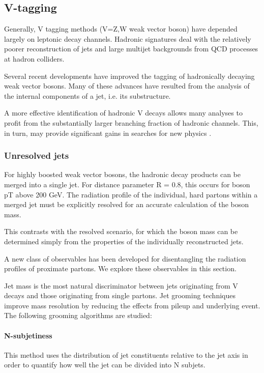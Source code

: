 \subsection{V-tagging}

Generally, V tagging methods (V=Z,W weak vector boson) have depended largely on leptonic decay channels. Hadronic signatures
deal with the relatively poorer reconstruction of jets and large multijet backgrounds from QCD processes at hadron colliders.

Several recent developments have improved the tagging of hadronically decaying weak vector bosons. Many of these advances have resulted from the analysis of the internal components
of a jet, i.e. its substructure.

A more effective identification of hadronic V decays allows many analyses to profit from the substantially larger branching fraction of hadronic channels. This,
in turn, may provide significant gains in searches for new physics \cite{vtagging}.

\subsubsection{Unresolved jets}

For highly boosted weak vector bosons, the hadronic decay products can be merged into a single jet. For distance parameter R = 0.8, this occurs for boson pT above 200 GeV. The radiation profile of the individual, hard partons within a merged jet must be explicitly resolved for an accurate calculation of the boson mass. 

This contrasts with the resolved scenario, for which the boson mass can be determined simply from the properties of the individually reconstructed jets.

A new class of observables has been developed for disentangling the radiation profiles of proximate partons. We explore these observables in this section.

Jet mass is the most natural discriminator between jets originating from V decays and those originating from single partons. Jet grooming techniques improve mass resolution by reducing the effects from pileup and underlying event. The following grooming algorithms are studied:

\paragraph{N-subjetiness}\label{tau21sec}
This method uses the distribution of jet constituents relative to the jet axis in order to quantify how well the jet can be divided into N subjets.

